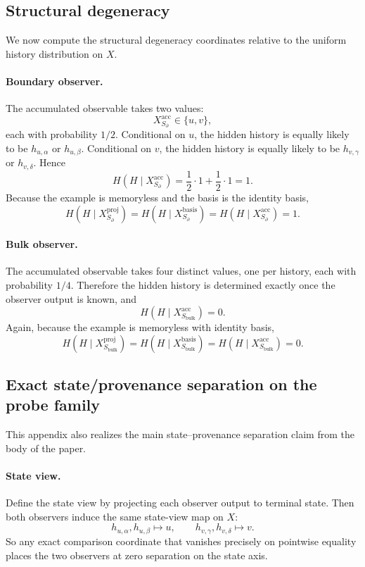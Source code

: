\documentclass[11pt,twoside]{article}
\theoremstyle{definition}
\newcommand{\proj}{\mathrm{proj}}
\newcommand{\basis}{\mathrm{basis}}
\newcommand{\acc}{\mathrm{acc}}
\newcommand{\bulk}{\mathrm{bulk}}
\begin{document}
\subsection{Structural degeneracy}
\label{app:boundary-bulk-structural-degeneracy}

We now compute the structural degeneracy coordinates relative to the uniform history distribution on \(X\).

\paragraph{Boundary observer.}
The accumulated observable takes two values:
\[
  X_{S_{\partial}}^{\acc} \in \{u,v\},
\]
each with probability \(1/2\). Conditional on \(u\), the hidden history is equally likely to be \(h_{u,\alpha}\) or \(h_{u,\beta}\). Conditional on \(v\), the hidden history is equally likely to be \(h_{v,\gamma}\) or \(h_{v,\delta}\). Hence
\[
  H(H\mid X_{S_{\partial}}^{\acc})
  =
  \frac12 \cdot 1 + \frac12 \cdot 1
  =
  1.
\]
Because the example is memoryless and the basis is the identity basis,
\[
  H(H\mid X_{S_{\partial}}^{\proj})
  =
  H(H\mid X_{S_{\partial}}^{\basis})
  =
  H(H\mid X_{S_{\partial}}^{\acc})
  =
  1.
\]

\paragraph{Bulk observer.}
The accumulated observable takes four distinct values, one per history, each with probability \(1/4\). Therefore the hidden history is determined exactly once the observer output is known, and
\[
  H(H\mid X_{S_{\bulk}}^{\acc})=0.
\]
Again, because the example is memoryless with identity basis,
\[
  H(H\mid X_{S_{\bulk}}^{\proj})
  =
  H(H\mid X_{S_{\bulk}}^{\basis})
  =
  H(H\mid X_{S_{\bulk}}^{\acc})
  =
  0.
\]

\subsection{Exact state/provenance separation on the probe family}
\label{app:boundary-bulk-state-prov-separation}

This appendix also realizes the main state--provenance separation claim from the body of the paper.

\paragraph{State view.}
Define the state view by projecting each observer output to terminal state. Then both observers induce the same state-view map on \(X\):
\[
  h_{u,\alpha}, h_{u,\beta} \mapsto u,
  \qquad
  h_{v,\gamma}, h_{v,\delta} \mapsto v.
\]
So any exact comparison coordinate that vanishes precisely on pointwise equality places the two observers at zero separation on the state axis.
\end{document}
